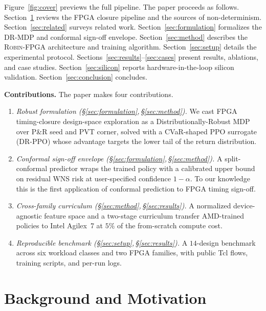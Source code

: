 \documentclass[journal]{IEEEtran}
\begin{document}
Figure~\ref{fig:cover} previews the full pipeline. The paper proceeds as follows. Section~\ref{sec:background} reviews the FPGA closure pipeline and the sources of non-determinism. Section~\ref{sec:related} surveys related work. Section~\ref{sec:formulation} formalizes the DR-MDP and conformal sign-off envelope. Section~\ref{sec:method} describes the \textsc{Robin-FPGA} architecture and training algorithm. Section~\ref{sec:setup} details the experimental protocol. Sections~\ref{sec:results}--\ref{sec:cases} present results, ablations, and case studies. Section~\ref{sec:silicon} reports hardware-in-the-loop silicon validation. Section~\ref{sec:conclusion} concludes.

\smallskip\noindent\textbf{Contributions.} The paper makes four contributions.
\begin{enumerate}
  \item \emph{Robust formulation (\S\ref{sec:formulation},\,\S\ref{sec:method}).} We cast FPGA timing-closure design-space exploration as a Distributionally-Robust MDP over P\&R seed and PVT corner, solved with a CVaR-shaped PPO surrogate (\textsc{DR-PPO}) whose advantage targets the lower tail of the return distribution.
  \item \emph{Conformal sign-off envelope (\S\ref{sec:formulation},\,\S\ref{sec:method}).} A split-conformal predictor wraps the trained policy with a calibrated upper bound on residual WNS risk at user-specified confidence $1{-}\alpha$. To our knowledge this is the first application of conformal prediction to FPGA timing sign-off.
  \item \emph{Cross-family curriculum (\S\ref{sec:method},\,\S\ref{sec:results}).} A normalized device-agnostic feature space and a two-stage curriculum transfer AMD-trained policies to Intel Agilex~7 at $5\%$ of the from-scratch compute cost.
  \item \emph{Reproducible benchmark (\S\ref{sec:setup},\,\S\ref{sec:results}).} A $14$-design benchmark across six workload classes and two FPGA families, with public Tcl flows, training scripts, and per-run logs.
\end{enumerate}

\section{Background and Motivation}
\label{sec:background}
\end{document}
